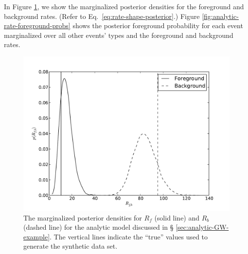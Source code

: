 \documentclass[aps,prd]{revtex4-1}
\begin{document}
In Figure \ref{fig:analytic-rate-recovery}, we show the marginalized
posterior densities for the foreground and background rates.  (Refer
to Eq.~\eqref{eq:rate-shape-posterior}.)  Figure
\ref{fig:analytic-rate-foreground-probs} shows the posterior
foreground probability for each event marginalized over all other
events' types and the foreground and background rates.

\begin{figure}
  \includegraphics[width=\columnwidth]{rates}
  \caption{\label{fig:analytic-rate-recovery} The marginalized
    posterior densities for $R_f$ (solid line) and $R_b$ (dashed line)
    for the analytic model discussed in \S
    \ref{sec:analytic-GW-example}.  The vertical lines indicate the
    ``true'' values used to generate the synthetic data set.}
\end{figure}
\end{document}
